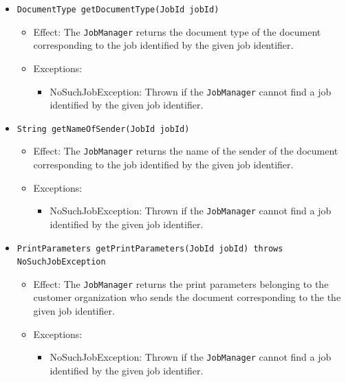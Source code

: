 \documentclass[a4paper,10pt]{article}
\begin{document}
\begin{itemize}
\begin{itemize}
         \item \texttt{DocumentType getDocumentType(JobId jobId)}
        \begin{itemize}
            \item Effect: The \texttt{JobManager} returns the document type of the document corresponding to the job identified by the given job identifier.
            \item Exceptions:
            \begin{itemize}
            	\item NoSuchJobException: Thrown if the \texttt{JobManager} cannot find a job identified by the given job identifier.
            \end{itemize}
        \end{itemize}    
        
        \item \texttt{String getNameOfSender(JobId jobId)}    
        \begin{itemize}
            \item Effect: The \texttt{JobManager} returns the name of the sender of the document corresponding to the job identified by the given job identifier.
            \item Exceptions:
            \begin{itemize}
            	\item NoSuchJobException: Thrown if the \texttt{JobManager} cannot find a job identified by the given job identifier.
            \end{itemize}
        \end{itemize}

        \item \texttt{PrintParameters getPrintParameters(JobId jobId) throws NoSuchJobException}    
        \begin{itemize}
            \item Effect: The \texttt{JobManager} returns the print parameters belonging to the customer organization who sends the document corresponding to the the given job identifier.
            \item Exceptions:
            \begin{itemize}
            	\item NoSuchJobException: Thrown if the \texttt{JobManager} cannot find a job identified by the given job identifier.
            \end{itemize}
        \end{itemize}
       

\end{itemize}
\end{itemize}
\end{document}
